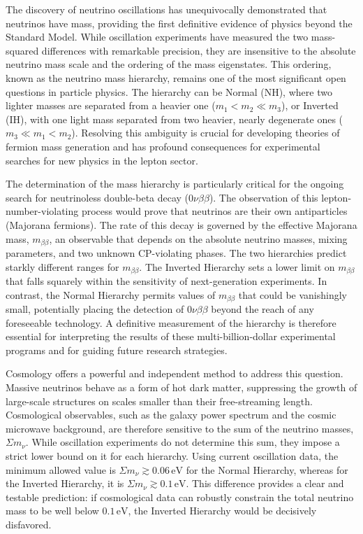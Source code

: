 \documentclass[]{article}
\begin{document}
The discovery of neutrino oscillations has unequivocally demonstrated that neutrinos have mass, providing the first definitive evidence of physics beyond the Standard Model. While oscillation experiments have measured the two mass-squared differences with remarkable precision, they are insensitive to the absolute neutrino mass scale and the ordering of the mass eigenstates. This ordering, known as the neutrino mass hierarchy, remains one of the most significant open questions in particle physics. The hierarchy can be Normal (NH), where two lighter masses are separated from a heavier one ($m_1 < m_2 \ll m_3$), or Inverted (IH), with one light mass separated from two heavier, nearly degenerate ones ($m_3 \ll m_1 < m_2$). Resolving this ambiguity is crucial for developing theories of fermion mass generation and has profound consequences for experimental searches for new physics in the lepton sector.

The determination of the mass hierarchy is particularly critical for the ongoing search for neutrinoless double-beta decay ($0\nu\beta\beta$). The observation of this lepton-number-violating process would prove that neutrinos are their own antiparticles (Majorana fermions). The rate of this decay is governed by the effective Majorana mass, $m_{\beta\beta}$, an observable that depends on the absolute neutrino masses, mixing parameters, and two unknown CP-violating phases. The two hierarchies predict starkly different ranges for $m_{\beta\beta}$. The Inverted Hierarchy sets a lower limit on $m_{\beta\beta}$ that falls squarely within the sensitivity of next-generation experiments. In contrast, the Normal Hierarchy permits values of $m_{\beta\beta}$ that could be vanishingly small, potentially placing the detection of $0\nu\beta\beta$ beyond the reach of any foreseeable technology. A definitive measurement of the hierarchy is therefore essential for interpreting the results of these multi-billion-dollar experimental programs and for guiding future research strategies.

Cosmology offers a powerful and independent method to address this question. Massive neutrinos behave as a form of hot dark matter, suppressing the growth of large-scale structures on scales smaller than their free-streaming length. Cosmological observables, such as the galaxy power spectrum and the cosmic microwave background, are therefore sensitive to the sum of the neutrino masses, $\Sigma m_\nu$. While oscillation experiments do not determine this sum, they impose a strict lower bound on it for each hierarchy. Using current oscillation data, the minimum allowed value is $\Sigma m_\nu \gtrsim 0.06\,\text{eV}$ for the Normal Hierarchy, whereas for the Inverted Hierarchy, it is $\Sigma m_\nu \gtrsim 0.1\,\text{eV}$. This difference provides a clear and testable prediction: if cosmological data can robustly constrain the total neutrino mass to be well below $0.1\,\text{eV}$, the Inverted Hierarchy would be decisively disfavored.
\end{document}
